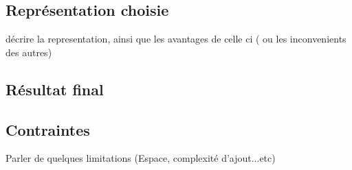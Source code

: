 \subsection{Représentation choisie}
décrire la representation, ainsi que les avantages de celle ci ( ou les inconvenients des autres)
\subsection{Résultat final}
\subsection{Contraintes}
Parler de quelques limitations (Espace, complexité d'ajout...etc)

				